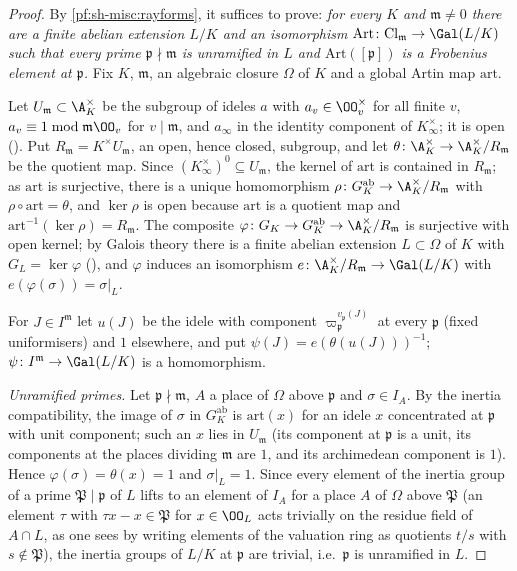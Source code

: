 \begin{proof}
By \cref{pf:sh-misc:rayforms}, it suffices to prove: \emph{for every $K$ and $\mathfrak m\ne0$ there are a finite abelian extension $L/K$
and an isomorphism $\mathrm{Art}\colon\mathrm{Cl}_{\mathfrak m}\to\Gal(L/K)$ such that every prime $\mathfrak p\nmid\mathfrak m$ is unramified in
$L$ and $\mathrm{Art}([\mathfrak p])$ is a Frobenius element at $\mathfrak p$.} Fix $K$, $\mathfrak m$, an algebraic closure $\Omega$ of $K$ and a global
Artin map $\mathrm{art}$.

Let $U_{\mathfrak m}\subset\A_K^\times$ be the subgroup of ideles $a$ with $a_v\in\OO_v^\times$ for all finite $v$, $a_v\equiv1\bmod\mathfrak m\OO_v$ for
$v\mid\mathfrak m$, and $a_\infty$ in the identity component of $K_\infty^\times$; it is open ().
Put $R_{\mathfrak m}=K^\times U_{\mathfrak m}$, an open, hence closed, subgroup, and let $\theta\colon\A_K^\times\to\A_K^\times/R_{\mathfrak m}$ be the
quotient map. Since $(K_\infty^\times)^0\subseteq U_{\mathfrak m}$, the kernel of $\mathrm{art}$ is contained in $R_{\mathfrak m}$; as $\mathrm{art}$ is
surjective, there is a unique homomorphism $\rho\colon G_K^{\mathrm{ab}}\to\A_K^\times/R_{\mathfrak m}$ with $\rho\circ\mathrm{art}=\theta$, and $\ker\rho$ is
open because $\mathrm{art}$ is a quotient map and $\mathrm{art}^{-1}(\ker\rho)=R_{\mathfrak m}$. The composite $\varphi\colon G_K\to G_K^{\mathrm{ab}}\to
\A_K^\times/R_{\mathfrak m}$ is surjective with open kernel; by Galois theory there is a finite abelian extension $L\subset\Omega$ of $K$ with
$G_L=\ker\varphi$ (), and $\varphi$ induces an isomorphism
$e\colon\A_K^\times/R_{\mathfrak m}\to\Gal(L/K)$ with $e(\varphi(\sigma))=\sigma|_L$.

For $J\in I^{\mathfrak m}$ let $u(J)$ be the idele with component $\varpi_{\mathfrak p}^{v_{\mathfrak p}(J)}$ at every $\mathfrak p$ (fixed uniformisers) and
$1$ elsewhere, and put $\psi(J)=e(\theta(u(J)))^{-1}$; $\psi\colon I^{\mathfrak m}\to\Gal(L/K)$ is a homomorphism.

\emph{Unramified primes.} Let $\mathfrak p\nmid\mathfrak m$, $A$ a place of $\Omega$ above $\mathfrak p$ and $\sigma\in I_A$. By the inertia compatibility,
the image of $\sigma$ in $G_K^{\mathrm{ab}}$ is $\mathrm{art}(x)$ for an idele $x$ concentrated at $\mathfrak p$ with unit component; such an $x$ lies in
$U_{\mathfrak m}$ (its component at $\mathfrak p$ is a unit, its components at the
places dividing $\mathfrak m$ are $1$, and its archimedean component is $1$). Hence $\varphi(\sigma)=\theta(x)=1$ and $\sigma|_L=1$. Since every element
of the inertia group of a prime $\mathfrak P\mid\mathfrak p$ of $L$ lifts to an element of $I_A$ for a place $A$ of $\Omega$ above $\mathfrak P$ (an element
$\tau$ with $\tau x-x\in\mathfrak P$ for $x\in\OO_L$ acts trivially on the residue field of $A\cap L$, as one sees by writing elements of
the valuation ring as quotients $t/s$ with $s\notin\mathfrak P$), the inertia groups of $L/K$ at $\mathfrak p$ are trivial, i.e.\ $\mathfrak p$ is
unramified in $L$.


\end{proof}
